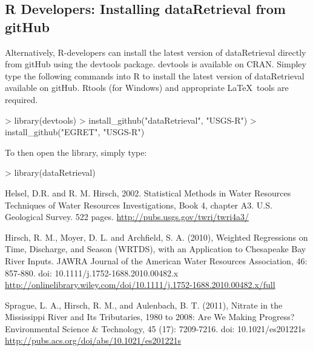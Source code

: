 \documentclass[a4paper,11pt]{article}
\begin{document}
\subsection{R Developers: Installing dataRetrieval from gitHub}
Alternatively, R-developers can install the latest version of dataRetrieval directly from gitHub using the devtools package.  devtools is available on CRAN.  Simpley type the following commands into R to install the latest version of dataRetrieval available on gitHub.  Rtools (for Windows) and appropriate \LaTeX\ tools are required.

\begin{Schunk}
\begin{Sinput}
> library(devtools)
> install_github("dataRetrieval", "USGS-R")
> install_github("EGRET", "USGS-R")
\end{Sinput}
\end{Schunk}
To then open the library, simply type:

\begin{Schunk}
\begin{Sinput}
> library(dataRetrieval)
\end{Sinput}
\end{Schunk}


\begin{thebibliography}{10}

Helsel, D.R. and R. M. Hirsch, 2002. Statistical Methods in Water Resources Techniques of Water Resources Investigations, Book 4, chapter A3. U.S. Geological Survey. 522 pages. \url{http://pubs.usgs.gov/twri/twri4a3/}

Hirsch, R. M., Moyer, D. L. and Archfield, S. A. (2010), Weighted Regressions on Time, Discharge, and Season (WRTDS), with an Application to Chesapeake Bay River Inputs. JAWRA Journal of the American Water Resources Association, 46: 857-880. doi: 10.1111/j.1752-1688.2010.00482.x \url{http://onlinelibrary.wiley.com/doi/10.1111/j.1752-1688.2010.00482.x/full}

Sprague, L. A., Hirsch, R. M., and Aulenbach, B. T. (2011), Nitrate in the Mississippi River and Its Tributaries, 1980 to 2008: Are We Making Progress? Environmental Science \& Technology, 45 (17): 7209-7216. doi: 10.1021/es201221s \url{http://pubs.acs.org/doi/abs/10.1021/es201221s}

\end{thebibliography}
\end{document}
